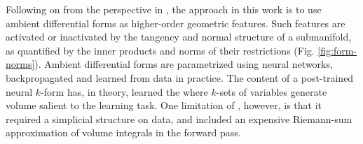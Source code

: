 \documentclass{article}
\let\todo\undefined
\let\todo\undefined
\newcommand{\todo}[1][]{}
\newcommand{\toref}[1][]{}
\theoremstyle{remark}
\theoremstyle{plain}
\begin{document}





 Following on from the perspective in \cite{maggs2023simplicial}, the approach in this work is to use ambient differential forms as higher-order geometric features. Such features are activated or inactivated by the tangency and normal structure of a submanifold, as quantified by the inner products and norms of their restrictions (Fig. \ref{fig:form-norms}). Ambient differential forms are parametrized using neural networks, backpropagated and learned from data in practice. The content of a post-trained neural $k$-form has, in theory, learned the where $k$-sets of variables generate volume salient to the learning task. One limitation of \cite{maggs2023simplicial}, however, is that it required a simplicial structure on data, and included an expensive Riemann-sum approximation of volume integrals in the forward pass.
 
\end{document}
